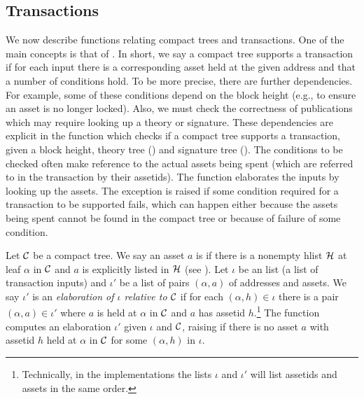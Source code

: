 \subsection{Transactions}

We now describe functions relating compact trees and transactions.
One of the main concepts is that of {}.
In short, we say a compact tree supports a transaction if for each
input there is a corresponding asset held at the given address
and that a number of conditions hold.
To be more precise, there are further dependencies.
For example, some of these conditions depend on the block height
(e.g., to ensure an asset is no longer locked).
Also, we must check the correctness of publications
which may require looking up a theory or signature.
These dependencies
are explicit in the function {}
which checks if a compact tree supports a transaction,
given a block height, theory tree ({}) and signature tree ({}).
The conditions to be checked often make reference to the actual assets
being spent (which are referred to in the transaction by their assetids).
The function {} elaborates
the inputs by looking up the assets.
The exception {} is raised if
some condition required for a transaction to be supported fails,
which can happen either because the assets being spent cannot be found
in the compact tree or because of failure of some condition.

Let $\mathcal{C}$ be a compact tree.
We say an asset $a$ is {}
if there is a nonempty hlist $\mathcal{H}$ at leaf $\alpha$ in $\mathcal{C}$ and $a$
is explicitly listed in $\mathcal{H}$ (see {}).
Let $\iota$ be an {} list (a list of transaction inputs)
and $\iota'$ be a list of pairs $(\alpha,a)$ of addresses and assets.
We say $\iota'$ is an {\emph{elaboration of $\iota$ relative to $\mathcal{C}$}}
if for each $(\alpha,h) \in\iota$ there is a pair $(\alpha,a) \in\iota'$
where $a$ is held at $\alpha$ in $\mathcal{C}$ and $a$ has assetid $h$.\footnote{Technically, in the implementations the lists $\iota$ and $\iota'$ will list assetids and assets in the same order.}
The function {} 
computes an elaboration $\iota'$ given $\iota$ and $\mathcal{C}$,
raising {} if 
there is no asset $a$ with assetid $h$ held at $\alpha$ in $\mathcal{C}$
for some $(\alpha,h)$ in $\iota$.


